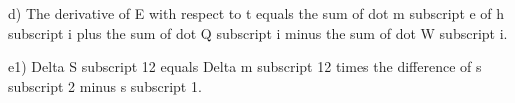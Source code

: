 d) The derivative of E with respect to t equals the sum of dot m subscript e of h subscript i plus the sum of dot Q subscript i minus the sum of dot W subscript i.

e1) Delta S subscript 12 equals Delta m subscript 12 times the difference of s subscript 2 minus s subscript 1.